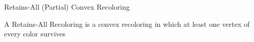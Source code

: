 \begin{frame}{Retains-All (Partial) Convex Recoloring}

\begin{definition}
A \alert{Retains-All Recoloring} 
is a convex recoloring in which at least one vertex of every color survives 
\end{definition}

\end{frame}
